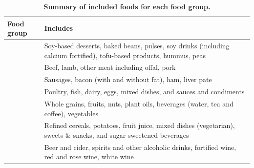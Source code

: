 \documentclass[
]{article}
\begin{document}
\begin{table}[h]
\caption{\label{tab:food-group}\textbf{Summary of included foods for each food group.}} 
\fontsize{9.0pt}{10.8pt}\selectfont
\begin{tabular*}{1\linewidth}{@{\extracolsep{\fill}}>{\raggedright\arraybackslash}p{}>{\raggedright\arraybackslash}p{}}
\toprule
\textbf{Food group} & \textbf{Includes} \\ 
\midrule\addlinespace[2.5pt]
{\bfseries Legumes} & Soy-based desserts, baked beans, pulses, soy drinks (including calcium fortified),
      tofu-based products, hummus, peas \\ 
{\bfseries Red meat} & Beef, lamb, other meat including offal, pork \\ 
{\bfseries Processed meat} & Sausages, bacon (with and without fat), ham, liver pate \\ 
{\bfseries Animal-based foods} & Poultry, fish, dairy, eggs, mixed dishes, and sauces and condiments \\ 
{\bfseries Healthy plant-based foods} & Whole grains, fruits, nuts, plant oils, beverages (water, tea and coffee), vegetables \\ 
{\bfseries Unhealthy plant-based foods} & Refined cereals, potatoes, fruit juice, mixed dishes (vegetarian), sweets \& snacks, and sugar sweetened beverages \\ 
{\bfseries Alcoholic beverages} & Beer and cider, spirits and other alcoholic drinks, fortified wine, red and rose wine, white wine \\ 
\bottomrule
\end{tabular*}
\end{table}
\end{document}
